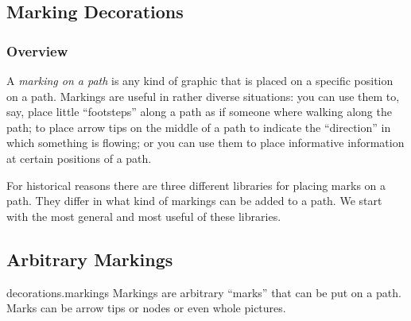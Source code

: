 \subsection{Marking Decorations}

\subsubsection{Overview}

A \emph{marking on a path} is any kind of graphic that is placed on a specific
position on a path. Markings are useful in rather diverse situations: you can
use them to, say, place little ``footsteps'' along a path as if someone where
walking along the path; to place arrow tips on the middle of a path to indicate
the ``direction'' in which something is flowing; or you can use them to place
informative information at certain positions of a path.

For historical reasons there are three different libraries for placing marks on
a path. They differ in what kind of markings can be added to a path. We start
with the most general and most useful of these libraries.


\subsection{Arbitrary Markings}

\begin{pgflibrary}{decorations.markings}
    Markings are arbitrary ``marks'' that can be put on a path. Marks can be
    arrow tips or nodes or even whole pictures.
\end{pgflibrary}

